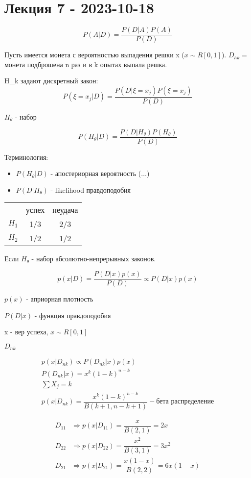 \chapter{Лекция 7 - 2023-10-18}

\[
P(A|D) = \dfrac{P(D|A) P(A)}{P(D)}
\]

\begin{ex}
  Пусть имеется монета с вероятностью выпадения решки x ($x \sim R[0, 1]$).
  $D_{hk} = $ монета подброшена n раз и в k опытах выпала решка.
  
  H_k задают дискретный закон:
  $$P(\xi = x_j | D) = \dfrac{P(D|\xi=x_j) P(\xi=x_j)}{P(D)}$$

  $H_\theta$ - набор 

  $$P(H_\theta | D) = \dfrac{P(D|H_\theta) P(H_\theta)}{P(D)}$$

  Терминология:
  \begin{itemize}
    \item $P(H_\theta |D)$ - апостериорная вероятность ($\dots$)
    \item $P(D|H_\theta)$ - likelihood правдоподобия
  \end{itemize}
\end{ex}

\begin{ex}
  \begin{tabular}{|c|c|c|}
    & успех & неудача \\
    $H_1$ & 1/3 & 2/3 \\
    $H_2$ & 1/2 & 1/2
  \end{tabular}


\end{ex}

Если $H_\theta$ - набор абсолютно-непрерывных законов.

\[
  p(x|D) = \dfrac{P(D|x) p(x)}{P(D)} \propto P(D|x) p(x)
\]

$p(x)$ - априорная плотность

$P(D|x)$ - функция правдоподобия

\begin{ex}
  x - вер успеха, $x \sim R[0, 1]$

  $D_{nk}$

  \begin{multline*}
    p(x|D_{nk}) \propto P(D_{nk} | x) p(x) \\
    P(D_{nk} | x) = x^k (1-k)^{n-k} \\
    \sum X_j = k \\
    p(x|D_{nk}) = \dfrac{x^k (1-k)^{n-k}}{B(k+1, n-k+1)} - \text{бета распределение}
  \end{multline*}

  \begin{align*}
    D_{11} &\Rightarrow p(x|D_{11}) = \dfrac{x}{B(2, 1)} = 2x \\
    D_{22} &\Rightarrow p(x|D_{22}) = \dfrac{x^2}{B(3, 1)} = 3x^2 \\
    D_{21} &\Rightarrow p(x|D_{21}) = \dfrac{x (1-x)}{B(2, 2)} = 6x(1-x)
  \end{align*}
\end{ex}


